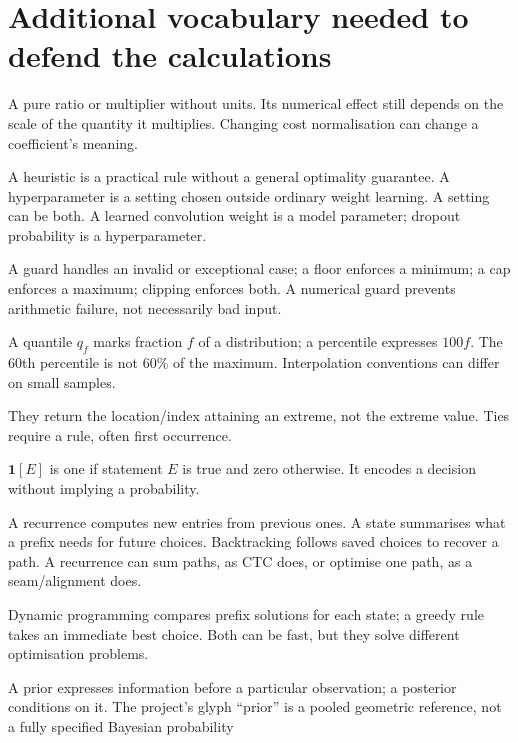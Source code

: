 \section{Additional vocabulary needed to defend the calculations}
\begin{description}[style=nextline]
\item[Dimensionless coefficient.] A pure ratio or multiplier without units.
Its numerical effect still depends on the scale of the quantity it multiplies.
Changing cost normalisation can change a coefficient's meaning.
\item[Heuristic versus hyperparameter.] A heuristic is a practical rule without
a general optimality guarantee. A hyperparameter is a setting chosen outside
ordinary weight learning. A setting can be both. A learned convolution weight
is a model parameter; dropout probability is a hyperparameter.
\item[Guard, floor, cap and clamp.] A guard handles an invalid or exceptional
case; a floor enforces a minimum; a cap enforces a maximum; clipping enforces
both. A numerical guard prevents arithmetic failure, not necessarily bad input.
\item[Quantile and percentile.] A quantile $q_f$ marks fraction $f$ of a
distribution; a percentile expresses $100f$. The 60th percentile is not
60\% of the maximum. Interpolation conventions can differ on small samples.
\item[Argmax and argmin.] They return the location/index attaining an extreme,
not the extreme value. Ties require a rule, often first occurrence.
\item[Indicator.] $\mathbf1[E]$ is one if statement $E$ is true and zero
otherwise. It encodes a decision without implying a probability.
\item[Recurrence, state and backtracking.] A recurrence computes new entries
from previous ones. A state summarises what a prefix needs for future choices.
Backtracking follows saved choices to recover a path. A recurrence can sum
paths, as CTC does, or optimise one path, as a seam/alignment does.
\item[Dynamic programming versus greedy choice.] Dynamic programming compares
prefix solutions for each state; a greedy rule takes an immediate best choice.
Both can be fast, but they solve different optimisation problems.
\item[Prior and posterior.] A prior expresses information before a particular
observation; a posterior conditions on it. The project's glyph ``prior'' is
a pooled geometric reference, not a fully specified Bayesian probability

\end{description}

